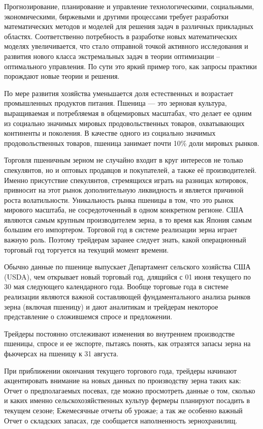 Прогнозирование, планирование и управление технологическими, социальными, экономическими, биржевыми и другими процессами требует разработки математических методов и моделей для решения задач в различных прикладных областях. Соответственно потребность в разработке новых математических моделях увеличивается, что стало отправной точкой активного исследования и развития нового класса экстремальных задач в теории оптимизации – оптимального управления. По сути это яркий пример того, как запросы практики порождают новые теории и решения.


По мере развития хозяйства уменьшается доля естественных и возрастает промышленных продуктов питания. Пшеница — это зерновая культура, выращиваемая и потребляемая в общемировых масштабах, что делает ее одним из социально значимых мировых продовольственных товаров, охватывающих континенты и поколения. В качестве одного из социально значимых продовольственных товаров, пшеница занимает почти 10\% доли мировых рынков.


Торговля пшеничным зерном не случайно входит в круг интересов не только спекулянтов, но и оптовых продавцов и покупателей, а также её производителей. Именно присутствие спекулянтов, стремящихся играть на разницах котировок, привносит на этот рынок дополнительную ликвидность и является причиной роста волатильности. Уникальность рынка пшеницы в том, что это рынок мирового масштаба, не сосредоточенный в одном конкретном регионе. США являются самым крупным производителем зерна, в то время как Япония самым большим его импортером.
Торговой год в системе реализации зерна играет важную роль. Поэтому трейдерам заранее следует знать, какой операционный торговый год торгуется на текущий момент времени.


Обычно данные по пшенице выпускает Департамент сельского хозяйства США (USDA), чем открывает новый торговый год, длящийся с 01 июня текущего по 30 мая следующего календарного года. Вообще торговые года в системе реализации являются важной составляющей фундаментального анализа рынков зерна (включая пшеницу) и дают аналитикам и трейдерам некоторое представление о сложившемся спросе и предложении.



Трейдеры постоянно отслеживают изменения во внутреннем производстве пшеницы, спросе и ее экспорте, пытаясь понять, как отразятся запасы зерна на фьючерсах на пшеницу к 31 августа.


При приближении окончания текущего торгового года, трейдеры начинают акцентировать внимание на новых данных по производству зерна таких как: Отчет о предполагаемых посевах, где можно просмотреть данные о том, сколько и каких именно сельскохозяйственных культур фермеры планируют посадить в текущем сезоне; Ежемесячные отчеты об урожае; а так же особенно важный Отчет о складских запасах, где сообщается наполненность зернохранилищ.


